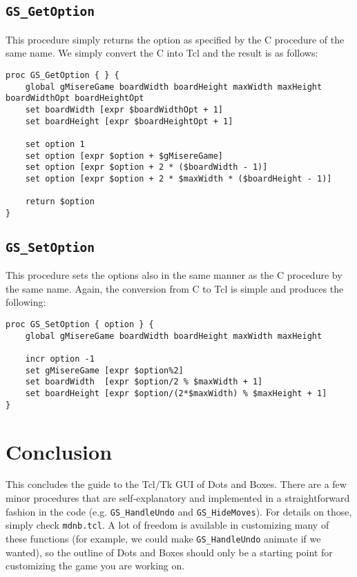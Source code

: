 \documentclass{article}
\begin{document}
\subsection{\texttt{GS\_GetOption}}

This procedure simply returns the option as specified by the C procedure of the same name. We simply convert the C into Tcl and the result is as follows:

\begin{verbatim}
proc GS_GetOption { } {
    global gMisereGame boardWidth boardHeight maxWidth maxHeight boardWidthOpt boardHeightOpt
    set boardWidth [expr $boardWidthOpt + 1]
    set boardHeight [expr $boardHeightOpt + 1]

    set option 1
    set option [expr $option + $gMisereGame]
    set option [expr $option + 2 * ($boardWidth - 1)]
    set option [expr $option + 2 * $maxWidth * ($boardHeight - 1)]

    return $option
}
\end{verbatim}

\subsection{\texttt{GS\_SetOption}}

This procedure sets the options also in the same manner as the C procedure by the same name. Again, the conversion from C to Tcl is simple and produces the following:

\begin{verbatim}
proc GS_SetOption { option } {
    global gMisereGame boardWidth boardHeight maxWidth maxHeight

    incr option -1
    set gMisereGame [expr $option%2]
    set boardWidth  [expr $option/2 % $maxWidth + 1]
    set boardHeight [expr $option/(2*$maxWidth) % $maxHeight + 1]
}
\end{verbatim}


\section{Conclusion}

This concludes the guide to the Tcl/Tk GUI of Dots and Boxes. There are a few minor procedures that are self-explanatory and implemented in a straightforward fashion in the code (e.g. \texttt{GS\_HandleUndo} and \texttt{GS\_HideMoves}). For details on those, simply check \texttt{mdnb.tcl}. A lot of freedom is available in customizing many of these functions (for example, we could make \texttt{GS\_HandleUndo} animate if we wanted), so the outline of Dots and Boxes should only be a starting point for customizing the game you are working on.
\end{document}
